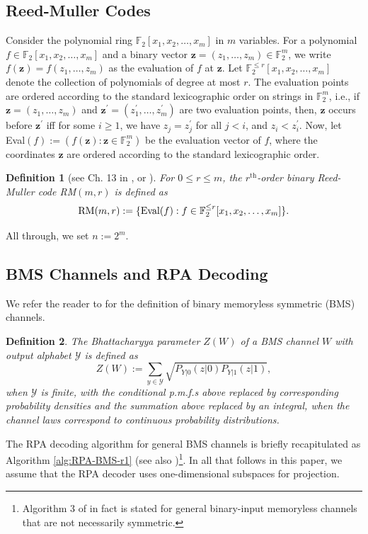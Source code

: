 \documentclass[conference,letterpaper]{IEEEtran}
\newtheorem{definition}{Definition}
\begin{document}
\subsection{Reed-Muller Codes}
Consider the polynomial ring $\mathbb{F}_2[x_1,x_2,\ldots,x_m]$ in $m$ variables. For a polynomial $f\in \mathbb{F}_2[x_1,x_2,\ldots,x_m]$ and a binary vector $\mathbf{z} = (z_1,\ldots,z_m)\in \mathbb{F}_2^m$, we write {$f(\mathbf{z})=f(z_1,\ldots,z_m)$} as the evaluation of $f$ at $\mathbf{z}$. Let $\mathbb{F}_2^{\leq r}[x_1,x_2,\ldots,x_m]$ denote the collection of polynomials of degree at most $r$. The evaluation points are ordered according to the standard lexicographic order on strings in $\mathbb{F}_2^m$, i.e., if $\mathbf{z} = (z_1,\ldots,z_m)$ and $\mathbf{z}^{\prime} = (z_1^{\prime},\ldots,z_m^{\prime})$ are two evaluation points, then, $\mathbf{z}$ occurs before $\mathbf{z}^{\prime}$ iff for some $i\geq 1$, we have $z_j = z_j^{\prime}$ for all $j<i$, and $z_i < z_i^{\prime}$. Now, let Eval$(f):=\left({f(\mathbf{z})}:\mathbf{z}\in \mathbb{F}_2^m\right)$ be the evaluation vector of $f$, where the coordinates $\mathbf{z}$ are ordered according to the standard lexicographic order. 

\begin{definition}[see Ch. 13 in \cite{mws}, or \cite{rm_survey}]
	{For $0\leq r\leq m$}, the $r^{\text{th}}$-order binary Reed-Muller code RM$(m,r)$ is defined as
	\[
	\text{\normalfont RM}(m,r):=\{\text{\normalfont Eval}(f): f\in \mathbb{F}_2^{\leq r}[x_1,x_2,\ldots,x_m]\}.
	\]
\end{definition}
All through, we set $n:=2^m$.
 \subsection{BMS Channels and RPA Decoding}
 We refer the reader to \cite[Ch. 4]{mct} for the definition of binary memoryless symmetric (BMS) channels. 
 \begin{definition}
 The Bhattacharyya parameter $Z(W)$ of a BMS channel $W$ with output alphabet $\mathcal{Y}$ is defined as 
    \[
    Z(W):=  \sum_{y\in \mathcal{Y}} \sqrt{P_{Y|0}(z|0)P_{Y|1}(z|1)},
    \]
    when $\mathcal{Y}$ is finite, with the conditional p.m.f.s above replaced by corresponding probability densities and the summation above replaced by an integral, when the channel laws correspond to continuous probability distributions.
\end{definition}
 The RPA decoding algorithm for general BMS channels is briefly recapitulated as Algorithm \ref{alg:RPA-BMS-r1} (see also \cite[Alg. 3]{rpa})\footnote{Algorithm 3 of \cite{rpa} in fact is stated for general binary-input memoryless channels that are not necessarily symmetric.}. In all that follows in this paper, we assume that the RPA decoder uses one-dimensional subspaces for projection.
 
\end{document}
